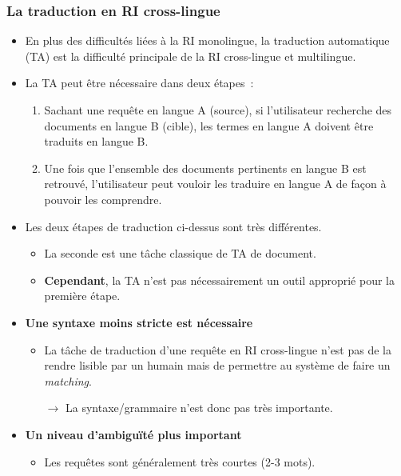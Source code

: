\documentclass[12pt,aspectratio=43,dvipsnames,table]{beamer}
\begin{document}
\begin{frame}[allowframebreaks]
    \frametitle{La traduction en RI cross-lingue}
    \begin{itemize} \itemsep10pt
        \item En plus des difficultés liées à la RI monolingue, la traduction 
              automatique (TA) est la difficulté principale de la RI 
              cross-lingue et multilingue.
        \item La TA peut être nécessaire dans deux étapes~:
        \begin{enumerate}
            \item Sachant une requête en langue A (source), si l'utilisateur 
                  recherche des documents en langue B (cible), les termes en 
                  langue A doivent être traduits en langue B.
            \item Une fois que l'ensemble des documents pertinents en langue B 
                  est retrouvé, l'utilisateur peut vouloir les traduire en 
                  langue A de façon à pouvoir les comprendre.
        \end{enumerate}

        \framebreak

        \item Les deux étapes de traduction ci-dessus sont très différentes.
        \begin{itemize}
            \item La seconde est une tâche classique de TA de document.
            \item \textbf{Cependant}, la TA n'est pas nécessairement un outil 
                  approprié pour la première étape.
        \end{itemize}
        \item \textbf{Une syntaxe moins stricte est nécessaire}
        \begin{itemize}
            \item La tâche de traduction d'une requête en RI cross-lingue 
                  n'est pas de la rendre lisible par un humain mais de permettre
                  au système de faire un \textit{matching}.
            \item[$\to$] La syntaxe/grammaire n'est donc pas très importante.
        \end{itemize}
        \item \textbf{Un niveau d'ambiguïté plus important}
        \begin{itemize}
            \item Les requêtes sont généralement très courtes (2-3 mots).
        \end{itemize}


\end{itemize}
\end{frame}
\end{document}
